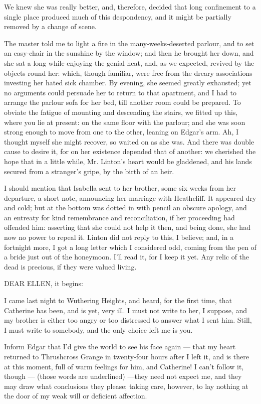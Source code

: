 \par We knew she was really better, and, therefore, decided that long confinement to a single place produced much of this despondency, and it might be partially removed by a change of scene.
\par The master told me to light a fire in the many-weeks-deserted parlour, and to set an easy-chair in the sunshine by the window; and then he brought her down, and she sat a long while enjoying the genial heat, and, as we expected, revived by the objects round her: which, though familiar, were free from the dreary associations investing her hated sick chamber. By evening, she seemed greatly exhausted; yet no arguments could persuade her to return to that apartment, and I had to arrange the parlour sofa for her bed, till another room could be prepared. To obviate the fatigue of mounting and descending the stairs, we fitted up this, where you lie at present: on the same floor with the parlour; and she was soon strong enough to move from one to the other, leaning on Edgar's arm. Ah, I thought myself she might recover, so waited on as she was. And there was double cause to desire it, for on her existence depended that of another: we cherished the hope that in a little while, Mr. Linton's heart would be gladdened, and his lands secured from a stranger's gripe, by the birth of an heir.
\par I should mention that Isabella sent to her brother, some six weeks from her departure, a short note, announcing her marriage with Heathcliff. It appeared dry and cold; but at the bottom was dotted in with pencil an obscure apology, and an entreaty for kind remembrance and reconciliation, if her proceeding had offended him: asserting that she could not help it then, and being done, she had now no power to repeal it. Linton did not reply to this, I believe; and, in a fortnight more, I got a long letter which I considered odd, coming from the pen of a bride just out of the honeymoon. I'll read it, for I keep it yet. Any relic of the dead is precious, if they were valued living.
\par 
\par DEAR ELLEN, it begins:
\par I came last night to Wuthering Heights, and heard, for the first time, that Catherine has been, and is yet, very ill. I must not write to her, I suppose, and my brother is either too angry or too distressed to answer what I sent him. Still, I must write to somebody, and the only choice left me is you.
\par Inform Edgar that I'd give the world to see his face again — that my heart returned to Thrushcross Grange in twenty-four hours after I left it, and is there at this moment, full of warm feelings for him, and Catherine! I can't follow it, though — (those words are underlined) —they need not expect me, and they may draw what conclusions they please; taking care, however, to lay nothing at the door of my weak will or deficient affection.
